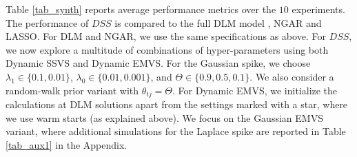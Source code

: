 \documentclass[ba]{imsart}
\numberwithin{equation}{section}
\theoremstyle{plain}
\def\B{\mbox{\boldmath$B$}}
\def\B{\mbox{\boldmath$B$}}
\newcommand{\bm}[1]{\boldsymbol{#1}}
\newcommand{\wh}[1]{\smash{\widehat{#1}}}
\def\B{\bm{B}}
\begin{document}
{ Table \ref{tab_synth} reports average performance metrics over the $10$ experiments.
The performance of $DSS$ is compared to the full DLM model \citep{WestHarrison1997book2}, NGAR \citep{kalli_griffin} and LASSO.
For DLM and NGAR, we use the same specifications as above.
For $DSS$, we now explore a multitude of combinations of hyper-parameters using both Dynamic SSVS and Dynamic EMVS.
For the Gaussian spike, we choose $\lambda_1\in\{0.1,0.01\}$, $\lambda_0\in\{0.01,0.001\}$, and $\Theta\in\{0.9,0.5,0.1\}$.  We also consider a random-walk prior variant with $\theta_{tj}=\Theta$. For Dynamic EMVS, we initialize the calculations at DLM solutions apart from the settings marked with a star, where we use warm starts (as explained above).
 We focus  on the Gaussian EMVS variant, where additional simulations for the Laplace spike are reported in Table \ref{tab_aux1} in the Appendix.

}
\end{document}

